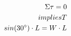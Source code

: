\documentclass[preview]{standalone}
\begin{document}
\begin{align*}
\special{dvisvgm:raw <g id='unique000'>}\Sigma \tau = 0 \\implies T \\sin(30^{\circ}) \cdot L = W \cdot L\special{dvisvgm:raw </g>}
\end{align*}
\end{document}
